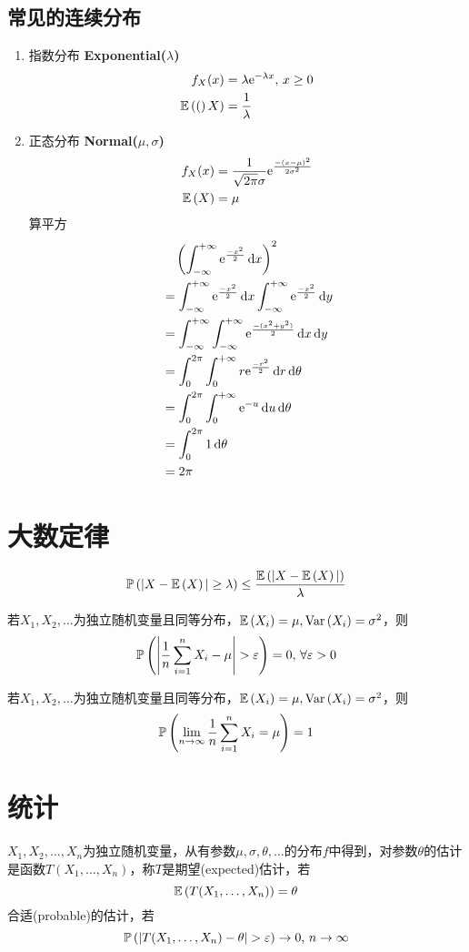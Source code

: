 \subsection{常见的连续分布}
\begin{enumerate}
	\item 指数分布 \textbf{Exponential($\lambda$)}
	\[\begin{aligned}
	f_X(x)&=\lambda\ee^{-\lambda x},\,x\geq 0\\
	\E(X)&=\dfrac{1}{\lambda}
	\end{aligned}\]
	\item 正态分布 \textbf{Normal($\mu,\sigma$)}
	\[\begin{aligned}
	f_X(x)&=\dfrac{1}{\sqrt{2\pi}\sigma}\ee^\frac{-(x-\mu)^2}{2\sigma^2}\\
	\E{X}&=\mu
	\end{aligned}\]
	算平方
	\[\begin{aligned}
	&\quad\left(\intinf{\ee^\frac{-x^2}{2}}\right)^2\\
	&=\intinf{\ee^\frac{-x^2}{2}}\intinf[y]{\ee^\frac{-x^2}{2}}\\
	&=\intinf[y]{\intinf{\ee^\frac{-(x^2+y^2)}{2}}}\\
	&=\intab[\theta]{0}{2\pi}{\intab[r]{0}{+\infty}{r\ee^\frac{-r^2}{2}}}\\
	&=\intab[\theta]{0}{2\pi}{\intab[u]{0}{+\infty}{\ee^{-u}}}\\
	&=\intab[\theta]{0}{2\pi}{1}\\
	&=2\pi
	\end{aligned}\]
\end{enumerate}

\section{大数定律}
\begin{theorem}
\[\pr{|X-\E{X}|\geq\lambda}\leq\dfrac{\E{|X-\E{X}|}}{\lambda}\]
\end{theorem}
\begin{theorem}[弱大数定律]
若$X_1,X_2,\ldots$为独立随机变量且同等分布，$\E{X_i}=\mu,\Var{X_i}=\sigma^2$，则
\[\pr{\lra{\dfrac{1}{n}\sum_{i=1}^nX_i-\mu}>\eps}=0,\,\forall\eps>0\]
\end{theorem}
\begin{theorem}[强大数定律]
若$X_1,X_2,\ldots$为独立随机变量且同等分布，$\E{X_i}=\mu,\Var{X_i}=\sigma^2$，则
\[\pr{\lim_{n\to\infty}\dfrac{1}{n}\sum_{i=1}^nX_i=\mu}=1\]
\end{theorem}

\section{统计}
\begin{definition}[估计]
$X_1,X_2,\ldots,X_n$为独立随机变量，从有参数$\mu,\sigma,\theta,\ldots$的分布$f$中得到，对参数$\theta$的估计是函数$T(X_1,\ldots,X_n)$，称$T$是期望(expected)估计，若
\[\E{T(X_1,\ldots,X_n)}=\theta\]
合适(probable)的估计，若
\[\pr{|T(X_1,\ldots,X_n)-\theta|>\eps}\to 0,\,n\to\infty\]
\end{definition}